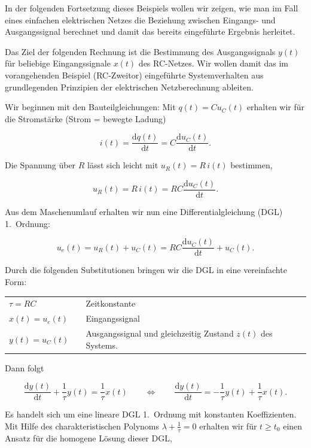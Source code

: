 In der folgenden Fortsetzung dieses Beispiels wollen wir zeigen, wie man im Fall eines einfachen elektrischen Netzes die Beziehung zwischen Eingangs- und Ausgangssignal berechnet und damit das bereits eingeführte Ergebnis herleitet.

\begin{beispiel}

Das Ziel der folgenden Rechnung ist die Bestimmung des Ausgangssignals $y(t)$ für beliebige Eingangssignale $x(t)$ des RC-Netzes. Wir wollen damit das im vorangehenden Beispiel (RC-Zweitor) eingeführte Systemverhalten aus grundlegenden Prinzipien der elektrischen Netzberechnung ableiten.

Wir beginnen mit den Bauteilgleichungen: Mit $q(t) = Cu_C(t)$ erhalten wir für die Stromstärke (Strom = bewegte Ladung)

$$
i(t) = \frac{\mathrm{d}q(t)}{\mathrm{d}t} = C\frac{\mathrm{d}u_C(t)}{\mathrm{d}t}.
$$

Die Spannung über $R$ lässt sich leicht mit $u_R(t) = R\,i(t)$ bestimmen,

$$
u_R(t) = R\,i(t) = RC\frac{\mathrm{d}u_C(t)}{\mathrm{d}t}.
$$

Aus dem Maschenumlauf erhalten wir nun eine Differentialgleichung (DGL) 1.\ Ordnung:

$$
u_e(t) = u_R(t) + u_C(t) = RC\frac{\mathrm{d}u_C(t)}{\mathrm{d}t} + u_C(t).
$$


Durch die folgenden Substitutionen bringen wir die DGL in eine vereinfachte Form:

\medskip
\begin{tabular}{lll}
  $\tau = RC$ & & Zeitkonstante \\
  $x(t) = u_e(t)$ & & Eingangssignal \\
  $y(t) = u_C(t)$ & & Ausgangssignal und gleichzeitig Zustand $z(t)$ des Systems.
\end{tabular}
\medskip

Dann folgt

$$
\frac{\mathrm{d}y(t)}{\mathrm{d}t} + \frac{1}{\tau}y(t) = \frac{1}{\tau}x(t) \qquad \Leftrightarrow \qquad \frac{\mathrm{d}y(t)}{\mathrm{d}t} = -\frac{1}{\tau}y(t) + \frac{1}{\tau}x(t).
$$

Es handelt sich um eine lineare DGL 1.\ Ordnung mit konstanten Koeffizienten. Mit Hilfe des charakteristischen Polynoms $\lambda + \tfrac{1}{\tau} = 0$ erhalten wir für $t \geq t_0$ einen Ansatz für die homogene Lösung dieser DGL,


\end{beispiel}
